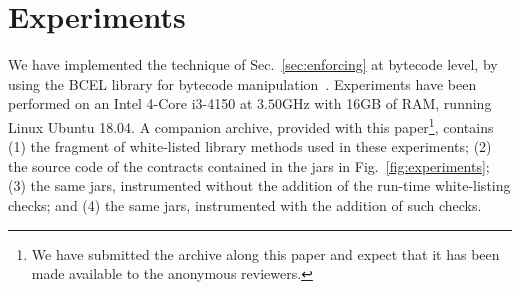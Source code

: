\section{Experiments}\label{sec:experiments}

We have implemented the technique of Sec.~\ref{sec:enforcing}
at bytecode level, by using the BCEL
library for bytecode manipulation~\cite{bcel}.
Experiments have been performed on
an Intel 4-Core i3-4150 at $3.50$GHz with 16GB of RAM, running Linux Ubuntu 18.04.
A companion archive, provided with this paper\footnote{We have submitted the archive
along this paper and expect that it has been made available to the anonymous reviewers.},
contains (1) the fragment of white-listed library methods
used in these experiments; (2) the source code of the contracts
contained in the jars in Fig.~\ref{fig:experiments};
(3) the same jars, instrumented without the addition of the run-time white-listing
checks; and (4) the same jars, instrumented with the addition of such checks.

